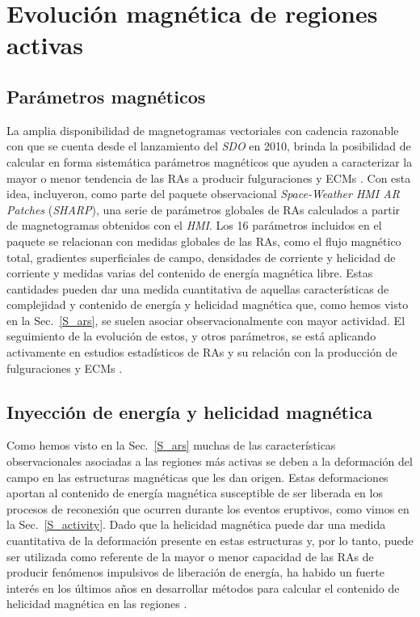 \documentclass[baaa]{baaa}
\begin{document}
\section{Evolución magnética de regiones activas}
\label{S_evol}

\subsection{Parámetros magnéticos}
\label{S_parameters}

La amplia disponibilidad de magnetogramas vectoriales con cadencia razonable con que se cuenta desde el lanzamiento del {\sl SDO} en 2010, brinda la posibilidad de calcular en forma sistemática parámetros magnéticos que ayuden a caracterizar la mayor o menor tendencia de las RAs a producir fulguraciones y ECMs \citep[ver p. ej.,][]{leka2007}. Con esta idea, \citet{bobra2014} incluyeron, como parte del paquete observacional {\sl Space-Weather HMI AR Patches} ({\sl SHARP}), una serie de parámetros globales de RAs calculados a partir de magnetogramas obtenidos con el {\sl HMI}. Los 16 parámetros incluidos en el paquete se relacionan con medidas globales de las RAs, como el flujo magnético total, gradientes superficiales de campo, densidades de corriente y helicidad de corriente y medidas varias del contenido de energía magnética libre. Estas cantidades pueden dar una medida cuantitativa de aquellas características de complejidad y contenido de energía y helicidad magnética que, como hemos visto en la Sec.~\ref{S_ars}, se suelen asociar observacionalmente con mayor actividad. El seguimiento de la evolución de estos, y otros parámetros, se está aplicando activamente en estudios estadísticos de RAs y su relación con la producción de fulguraciones y ECMs \citep[ver p. ej.,][]{georgoulis2021}. 

\subsection{Inyección de energía y helicidad magnética}
\label{S_helicity}

Como hemos visto en la Sec.~\ref{S_ars} muchas de las características observacionales asociadas a las regiones más activas se deben a la deformación del campo en las estructuras magnéticas que les dan origen. Estas deformaciones aportan al contenido de energía magnética susceptible de ser liberada en los procesos de reconexión que ocurren durante los eventos eruptivos, como vimos en la Sec.~\ref{S_activity}. Dado que la helicidad magnética puede dar una medida cuantitativa de la deformación presente en estas estructuras y, por lo tanto, puede ser utilizada como referente de la mayor o menor capacidad de las RAs de producir fenómenos impulsivos de liberación de energía, ha habido un fuerte interés en los últimos años en desarrollar métodos para calcular el contenido de helicidad magnética en las regiones \citep{green2002,demoulin2009,thalmann2021}. 
\end{document}
